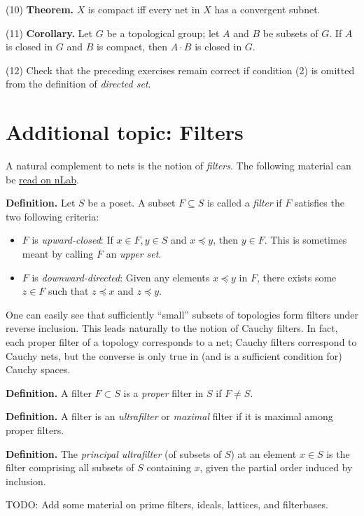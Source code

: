 \documentclass[a4paper]{article}
\begin{document}
(10) \textbf{Theorem.} $X$ is compact iff every net in $X$ has a convergent subnet.

(11) \textbf{Corollary.} Let $G$ be a topological group; let $A$ and $B$ be subsets of $G$. If $A$ is closed in $G$ and $B$ is compact, then $A \cdot B$ is closed in $G$.

(12) Check that the preceding exercises remain correct if condition (2) is omitted from the definition of \emph{directed set}.

\section*{Additional topic: Filters}

A natural complement to nets is the notion of \emph{filters}. The following material can be \href{https://web.archive.org/web/20220510181051/https://ncatlab.org/nlab/show/filter}{read on nLab}.

\textbf{Definition.} Let $S$ be a poset. A subset $F \subseteq S$ is called a \emph{filter} if $F$ satisfies the two following criteria:

\begin{itemize}
    \item $F$ is \emph{upward-closed}: If $x \in F, y \in S$ and $x \preceq y$, then $y \in F$. This is sometimes meant by calling $F$ an \emph{upper set}.
    \item $F$ is \emph{downward-directed}: Given any elements $x \preceq y$ in $F$, there exists some $z \in F$ such that $z \preceq x$ and $z \preceq y$.
\end{itemize}

One can easily see that sufficiently ``small'' subsets of topologies form filters under reverse inclusion. This leads naturally to the notion of Cauchy filters. In fact, each proper filter of a topology corresponds to a net; Cauchy filters correspond to Cauchy nets, but the converse is only true in (and is a sufficient condition for) Cauchy spaces.

\textbf{Definition.} A filter $F \subset S$ is a \emph{proper} filter in $S$ if $F \neq S$.

\textbf{Definition.} A filter is an \emph{ultrafilter} or \emph{maximal} filter if it is maximal among proper filters.

\textbf{Definition.} The \emph{principal ultrafilter} (of subsets of $S$) at an element $x \in S$ is the filter comprising all subsets of $S$ containing $x$, given the partial order induced by inclusion.

TODO: Add some material on prime filters, ideals, lattices, and filterbases.
\end{document}
